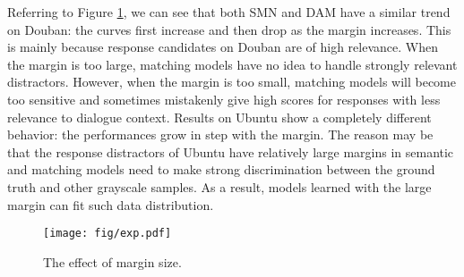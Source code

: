 \documentclass[11pt,a4paper]{article}
\begin{document}
	Referring to Figure \ref{mu-pic}, we can see that both SMN and DAM have a similar trend on Douban: the curves first increase and then drop as the margin increases. This is mainly because response candidates on Douban are of high relevance. When the margin is too large, matching models have no idea to handle strongly relevant distractors. However, when the margin is too small, matching models will become too sensitive and sometimes mistakenly give high scores for responses with less relevance to dialogue context. Results on Ubuntu show a completely different behavior: the performances grow in step with the margin. The reason may be that the response distractors of Ubuntu have relatively large margins in semantic and matching models need to make strong discrimination between the ground truth and other grayscale samples. As a result, models learned with the large margin can fit such data distribution.
	\begin{figure}[t]
		\centering
		\texttt{[image: fig/exp.pdf]}
		\caption{ The effect of margin size.}
		\label{mu-pic}
	\end{figure}
\end{document}
